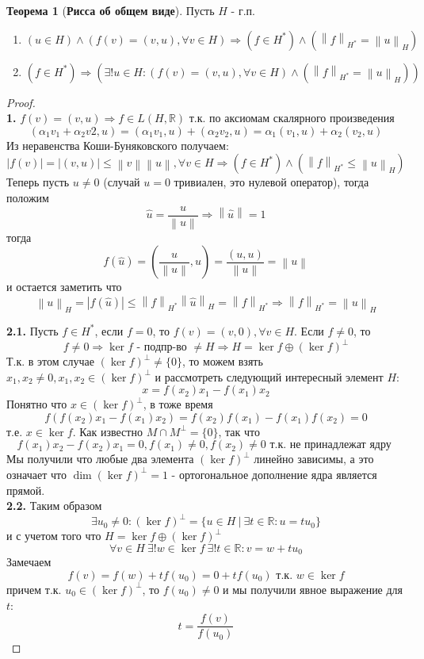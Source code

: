\documentclass[12pt,a4paper]{article}
\theoremstyle{definition}
\newtheorem{theorem}{Теорема}
\newcommand{\Real}{\mathbb{R}}
\newcommand{\norm}[1]{\left\lVert#1\right\rVert}
\newcommand{\setbuild}[2]{\{#1\:|\:#2\}}
\begin{document}
\begin{theorem}[\textbf{Рисса об общем виде}]\label{th:Rietz_general} 
	Пусть $H$ - г.п.
	\begin{enumerate}
		\item $(u \in H)\wedge(f(v)=(v,u), \forall v\in H) \Rightarrow (f\in H^*) \wedge (\norm{f}_{H^*}=\norm{u}_H)$
		\item $(f\in H^*)\Rightarrow (\exists! u\in H: (f(v)=(v,u),\forall v\in H)\wedge(\norm{f}_{H^*} = \norm{u}_H))$
	\end{enumerate}
\end{theorem}
\begin{proof}
	$ $ \\
	
	\textbf{1.} $f(v)=(v,u) \Rightarrow f\in L(H,\Real)$ т.к. по аксиомам скалярного произведения 
	$$(\alpha_1 v_1 + \alpha_2 v2, u) = (\alpha_1 v_1, u) + (\alpha_2 v_2, u) = \alpha_1 (v_1, u) + \alpha_2 (v_2, u)$$
	Из неравенства Коши-Буняковского получаем:
	$$|f(v)| = |(v,u)| \leq \norm{v}\norm{u},\forall v\in H \Rightarrow (f\in H^*) \wedge (\norm{f}_{H^*} \leq \norm{u}_H)$$	
	Теперь пусть $u \neq 0$ (случай $u = 0$ тривиален, это нулевой оператор), тогда положим 
	$$\hat{u} = \frac{u}{\norm{u}} \Rightarrow \norm{\hat{u}} = 1$$ 
	тогда $$f(\hat{u}) = (\frac{u}{\norm{u}}, u) = \frac{(u,u)}{\norm{u}} = \norm{u}$$
	и остается заметить что
	$$\norm{u}_H = |f(\hat{u})| \leq \norm{f}_{H^*} \norm{\hat{u}}_H = \norm{f}_{H^*} \Rightarrow \norm{f}_{H^*} = \norm{u}_{H}$$
	\newline
	
	\textbf{2.1.} Пусть $f \in H^*$, если $f = 0$, то $f(v)=(v,0),\forall v \in H$. Если $f \neq 0$, то 
	$$f \neq 0 \Rightarrow \ker{f} \text{ - подпр-во } \neq H \Rightarrow H = \ker{f} \oplus (\ker{f})^\perp$$ 
	Т.к. в этом случае $(\ker{f})^\perp \neq \{0\}$, то можем взять $x_1, x_2 \neq 0, x_1, x_2 \in (\ker{f})^\perp$ и рассмотреть следующий интересный элемент $H$:
	$$x = f(x_2)x_1 - f(x_1)x_2$$
	Понятно что $x \in (\ker{f})^\perp$, в тоже время
	$$f(f(x_2)x_1 - f(x_1)x_2) = f(x_2)f(x_1) - f(x_1)f(x_2) = 0$$ т.е. $x \in \ker{f}$. Как известно $M\cap M^\perp = \{0\}$, так что
	$$f(x_1)x_2 - f(x_2)x_1 = 0, f(x_1) \neq 0, f(x_2) \neq 0 \text{ т.к. не принадлежат ядру }$$
	Мы получили что любые два элемента $(\ker{f})^\perp$ линейно зависимы, а это означает что $\dim{(\ker{f})^\perp} = 1$ - ортогональное дополнение ядра является прямой. \\
	
	\textbf{2.2.} Таким образом $$\exists u_0 \neq 0: (\ker{f})^\perp = \setbuild{u\in H}{\exists t \in \Real: u = t u_0}$$
	и с учетом того что $H = \ker{f} \oplus (\ker{f})^\perp$
	$$\forall v \in H \: \exists!w\in\ker{f} \: \exists!t\in\Real: v = w + tu_0$$ 
	Замечаем
	$$f(v) = f(w) + tf(u_0) = 0 + tf(u_0) \text{ т.к. } w\in\ker{f} $$
	причем т.к. $u_0 \in (\ker{f})^\perp$, то $f(u_0) \neq 0$ и мы получили явное выражение для $t$:
	$$t = \frac{f(v)}{f(u_0)} $$
	

\end{proof}
\end{document}
